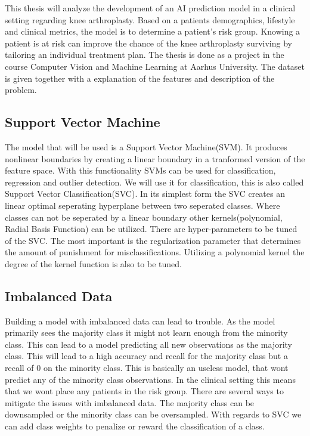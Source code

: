 This thesis will analyze the development of an AI prediction model in a clinical setting regarding knee arthroplasty. Based on a patients demographics, lifestyle and clinical metrics, the model is to determine a patient's risk group. Knowing a patient is at risk can improve the chance of the knee arthroplasty surviving by tailoring an individual treatment plan. The thesis is done as a project in the course Computer Vision and Machine Learning at Aarhus University. The dataset is given together with a explanation of the features and description of the problem.     

\subsection*{Support Vector Machine}
The model that will be used is a Support Vector Machine(SVM). It produces nonlinear boundaries by creating a linear boundary in a tranformed version of the feature space. With this functionality SVMs can be used for classification, regression and outlier detection. We will use it for classification, this is also called Support Vector Classification(SVC). In its simplest form the SVC creates an linear optimal seperating hyperplane between two seperated classes. Where classes can not be seperated by a linear boundary other kernels(polynomial, Radial Basis Function) can be utilized. There are hyper-parameters to be tuned of the SVC. The most important is the regularization parameter that determines the amount of punishment for misclassifications. Utilizing a polynomial kernel the degree of the kernel function is also to be tuned.        

\subsection{Imbalanced Data}
Building a model with imbalanced data can lead to trouble. As the model primarily sees the majority class it might not learn enough from the minority class. This can lead to a model predicting all new observations as the majority class. This will lead to a high accuracy and recall for the majority class but a recall of 0 on the minority class. This is basically an useless model, that wont predict any of the minority class observations. In the clinical setting this means that we wont place any patients in the risk group. There are several ways to mitigate the issues with imbalanced data. The majority class can be downsampled or the minority class can be oversampled. With regards to SVC we can add class weights to penalize or reward the classification of a class.    


